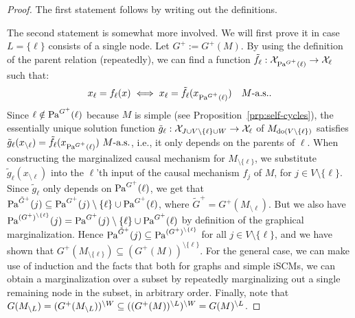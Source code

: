 \begin{proof}
  The first statement follows by writing out the definitions. 
  
  The second statement is somewhat more involved. We will
  first prove it in case $L = \{\ell\}$ consists of a single node. 
  Let $G^+ := G^+(M)$.
  By using the definition of the parent relation (repeatedly), we can find a function $\tilde{f}_\ell : \mathcal{X}_{\mathrm{Pa}^{G^+}(\ell)} \to \mathcal{X}_\ell$ such that:
  $$x_\ell = f_\ell(x) \iff x_\ell = \tilde{f}_\ell(x_{\mathrm{Pa}^{G^+}(\ell)})\quad M\text{-a.s.}.$$
  Since $\ell \notin \mathrm{Pa}^{G^+}(\ell)$ because $M$ is simple (see Proposition~\ref{prp:self-cycles}), %
  the essentially unique solution function
  $\tilde{g}_\ell : \mathcal{X}_{J \cup V \setminus \{\ell\} \cup W} \to \mathcal{X}_\ell$ of $M_{\operatorname{do}(V\setminus \{\ell\})}$
  satisfies $\tilde{g}_\ell(x_{\setminus \ell}) = \tilde{f}_\ell(x_{\mathrm{Pa}^{G^+}(\ell)})\ M\text{-a.s.}$, i.e., it only depends on the parents of $\ell$.
  When constructing the marginalized causal mechanism for $M_{\setminus \{\ell\}}$, we substitute 
  $\tilde{g}_\ell(x_{\setminus \ell})$ into the $\ell$'th input of the causal mechanism $f_j$ of $M$, for $j \in V\setminus \{\ell\}$.
  Since $\tilde{g}_\ell$ only depends on $\mathrm{Pa}^{G^+}(\ell)$,
  we get that $\mathrm{Pa}^{\tilde G^+}(j) \subseteq \mathrm{Pa}^{G^+}(j) \setminus \{\ell\} \cup \mathrm{Pa}^{G^+}(\ell)$, where $\tilde{G}^+ = G^+(M_{\setminus \ell})$.
  But we also have $\mathrm{Pa}^{(G^+)^{\setminus \{\ell\}}}(j) = \mathrm{Pa}^{G^+}(j) \setminus \{\ell\} \cup \mathrm{Pa}^{G^+}(\ell)$ by definition of the graphical marginalization. 
  Hence $\mathrm{Pa}^{\tilde G^+}(j) \subseteq \mathrm{Pa}^{(G^+)^{\setminus \{\ell\}}}$ for all $j \in V\setminus \{\ell\}$, and we have shown that $G^+(M_{\setminus \{\ell\}}) \subseteq (G^+(M))^{\setminus \{\ell\}}$.
  For the general case, we can make use of induction and the facts that both for
  graphs and simple iSCMs, we can obtain a marginalization over a subset by repeatedly marginalizing out a single remaining node in the subset, in arbitrary order.
  Finally, note that $G(M_{\setminus L}) = (G^+(M_{\setminus L}))^{\setminus W} \subseteq ((G^+(M))^{\setminus L})^{\setminus W} = G(M)^{\setminus L}$.
\end{proof}
